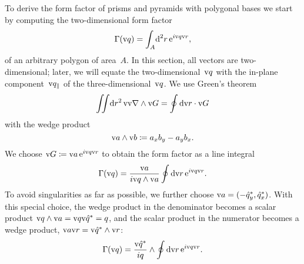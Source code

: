 To derive the form factor of prisms and pyramids with polygonal bases
we start by computing the two-dimensional form factor
\begin{equation}\label{Eff2d}
  \Gamma(\text{v}{q})=\int_A\!\text{d}^2r\, \text{e}^{i\text{v}{q}\text{v}{r}},
\end{equation}
of an arbitrary polygon of area~$A$.
In this section, all vectors are two-dimensional;
later, we will equate the two-dimensional~$\text{v}{q}$ with the in-plane
component~$\text{v}{q}_\parallel$ of the three-dimensional~$\text{v}{q}$.
We use Green's theorem
\begin{equation}
  \iint\!\text{d} r^2\,\text{v}{\text{v}{\nabla}}\wedge\text{v}{G} = \oint \text{d}\text{v}{r}\cdot\text{v}{G}
\end{equation}
with the wedge product
\begin{equation}
  \text{v}{a}\wedge\text{v}{b} \coloneqq
  a_xb_y - a_yb_x.
\end{equation}
We choose $\text{v}{G}\coloneqq\text{v}{a}\, \text{e}^{i\text{v}{q}\text{v}{r}}$
to obtain the form factor as a line integral
\begin{equation}
  \Gamma(\text{v}{q})=\frac{\text{v}{a}}{i \text{v}{q}\wedge\text{v}{a}} \oint \text{d}\text{v}{r}\,\text{e}^{i\text{v}{q}\text{v}{r}}.
\end{equation}
To avoid singularities as far as possible,
we further choose $\text{v}{a}=(-\hat q_y^*,\hat q_x^*)$.
With this special choice,
the wedge product in the denominator becomes a scalar product
$\text{v}{q}\wedge\text{v}{a}=\text{v}{q}\text{v}{\hat q^*}=q$, and
the scalar product in the numerator becomes a wedge product,
$\text{v}{a}\text{v}{r}=\text{v}{\hat q^*}\wedge\text{v}{r}$:
\begin{equation}
  \Gamma(\text{v}{q})=\frac{\text{v}{\hat q^*}}{iq}\wedge \oint \text{d}\text{v}{r}\,\text{e}^{i\text{v}{q}\text{v}{r}}.
\end{equation}

